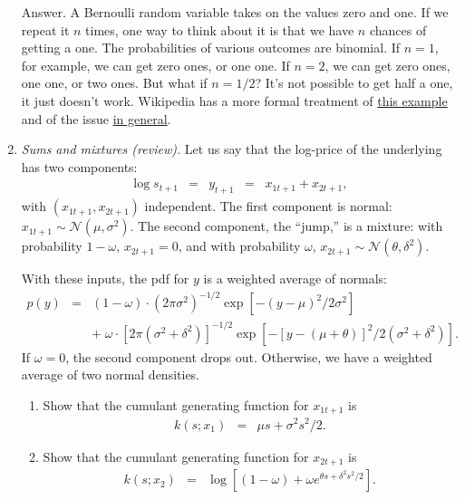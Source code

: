\documentclass[11pt]{article}
\begin{document}
\begin{enumerate}
Answer. A Bernoulli random variable takes on the values zero and one.
If we repeat it $n$ times, one way to think about it is that
we have $n$ chances of getting a one.
The probabilities of various outcomes are binomial.
If $n=1$, for example, we can get zero ones, or one one.
If $n=2$, we can get zero ones, one one, or two ones.
But what if $n=1/2$?
It's not possible to get half a one, it just doesn't work.
Wikipedia has a more formal treatment of
\href{http://en.wikipedia.org/wiki/Indecomposable_distribution}{this example}
and of the issue
\href{http://en.wikipedia.org/wiki/Infinite_divisibility_(probability)}
{in general}.


\item {\it Sums and mixtures (review).\/}
Let us say that the log-price of the underlying has two components:
\begin{eqnarray*}
    \log s_{t+1} &=& y_{t+1} \;\;=\;\; x_{1t+1} + x_{2t+1},
\end{eqnarray*}
with $( x_{1t+1}, x_{2t+1})$ independent.
The first component is normal:
$ x_{1t+1} \sim \mathcal{N}(\mu,\sigma^2)$.
The second component, the ``jump,'' is a mixture:
with probability $1-\omega$, $ x_{2t+1} = 0$,
and with probability $\omega$,
$ x_{2t+1} \sim \mathcal{N}(\theta,\delta^2)$.

With these inputs, the pdf for $y$ is a weighted average of normals:
\begin{eqnarray}
    p(y) &=& (1-\omega) \cdot ( 2 \pi \sigma^2)^{-1/2} \exp[ - (y-\mu)^2/2\sigma^2]
            \nonumber \\
    && + \; \omega \cdot [ 2 \pi (\sigma^2+\delta^2)]^{-1/2}
            \exp[ - [y-(\mu+\theta)]^2/2(\sigma^2 + \delta^2)] .
            \label{eq:bernoulli-mixture}
\end{eqnarray}
If $\omega = 0$, the second component drops out.
Otherwise, we have a weighted average of two normal densities.

\begin{enumerate}
\item Show that the cumulant generating function for $x_{1t+1}$ is
\begin{eqnarray*}
    k (s; x_1) &=&  \mu s + \sigma^2 s^2 / 2 .
\end{eqnarray*}

\item Show that the cumulant generating function for $x_{2t+1}$ is
\begin{eqnarray*}
    k (s; x_2) &=& \log \left[ (1-\omega) + \omega e^{ \theta s + \delta^2 s^2 / 2 }
            \right] .
\end{eqnarray*}


\end{enumerate}
\end{enumerate}
\end{document}
